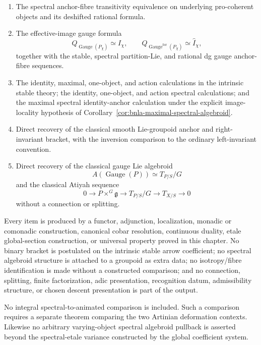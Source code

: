 \begin{theorem}
\begin{enumerate}
    \item The spectral anchor-fibre transitivity equivalence on underlying
    pro-coherent objects and its deshifted rational formula.

    \item The effective-image gauge formula
    \[
        Q_{\operatorname{Gauge}(P_\chi)}\simeq I_\chi,
        \qquad
        Q_{\operatorname{Gauge}^{\mathrm{for}}(P_\chi)}
        \simeq\widehat I_\chi,
    \]
    together with the stable, spectral partition-Lie, and rational dg gauge
    anchor-fibre sequences.

    \item The identity, maximal, one-object, and action calculations in the
    intrinsic stable theory; the identity, one-object, and action spectral
    calculations; and the maximal spectral identity-anchor calculation under
    the explicit image-locality hypothesis of
    Corollary~\ref{cor:bnla-maximal-spectral-algebroid}.

    \item Direct recovery of the classical smooth Lie-groupoid anchor and
    right-invariant bracket, with the inversion comparison to the ordinary
    left-invariant convention.

    \item Direct recovery of the classical gauge Lie algebroid
    \[
        A(\operatorname{Gauge}(P))
        \simeq T_{P/S}/G
    \]
    and the classical Atiyah sequence
    \[
        0\longrightarrow P\times^G\mathfrak g
        \longrightarrow T_{P/S}/G
        \longrightarrow T_{X/S}
        \longrightarrow0
    \]
    without a connection or splitting.
\end{enumerate}

Every item is produced by a functor, adjunction, localization, monadic or
comonadic construction, canonical cobar resolution, continuous duality,
etale global-section construction, or universal property proved in this chapter.  No binary
bracket is postulated on the intrinsic stable arrow coefficient; no spectral
algebroid structure is attached to a groupoid as extra data; no
isotropy/fibre identification is made without a constructed comparison; and
no connection, splitting, finite factorization, adic presentation,
recognition datum, admissibility structure, or chosen descent presentation is
part of the output.

No integral spectral-to-animated comparison is included.  Such a comparison
requires a separate theorem comparing the two Artinian deformation contexts.
Likewise no arbitrary varying-object spectral algebroid pullback is asserted
beyond the spectral-etale variance constructed by the global coefficient
system.
\end{theorem}

